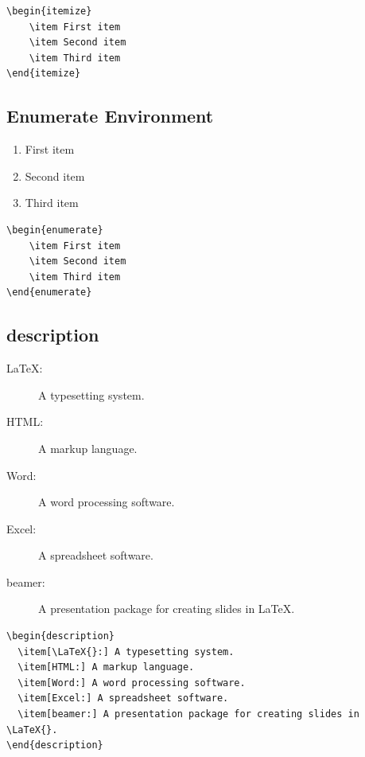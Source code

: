 \documentclass[12pt]{article}
\begin{document}
\begin{verbatim}
\begin{itemize}
    \item First item
    \item Second item
    \item Third item
\end{itemize}
\end{verbatim}

\subsection{Enumerate Environment}
\begin{enumerate}
    \item First item
    \item Second item
    \item Third item
\end{enumerate} 

\begin{verbatim}
\begin{enumerate}
    \item First item
    \item Second item
    \item Third item
\end{enumerate}
\end{verbatim}


\subsection{description}

\begin{description}
  \item[\LaTeX{}:] A typesetting system.
  \item[HTML:] A markup language.
  \item[Word:] A word processing software.
  \item[Excel:] A spreadsheet software.
  \item[beamer:] A presentation package for creating slides in \LaTeX{}.
\end{description}

\begin{verbatim}
\begin{description}
  \item[\LaTeX{}:] A typesetting system.
  \item[HTML:] A markup language.
  \item[Word:] A word processing software.
  \item[Excel:] A spreadsheet software.
  \item[beamer:] A presentation package for creating slides in \LaTeX{}.
\end{description}
\end{verbatim}
\end{document}
